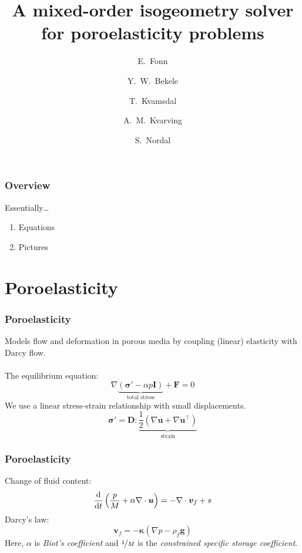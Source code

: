 \documentclass{beamer}
\begin{document}
\title[Mixed-order poroelasticity]{A mixed-order isogeometry solver for poroelasticity problems}
\author[E. Fonn]{
  E.~Fonn \and
  Y.~W.~Bekele \and
  T.~Kvamsdal \and
  A.~M.~Kvarving \and
  S.~Nordal
}
\date[IGA 2015]{}


\begin{frame}
  \titlepage{}
\end{frame}

\begin{frame}
  \frametitle{Overview}

  Essentially\ldots
  \begin{enumerate}
  \item Equations
  \item Pictures
  \end{enumerate}
\end{frame}

\section{Poroelasticity}

\begin{frame}
  \frametitle{Poroelasticity}

  Models flow and deformation in porous media by coupling (linear) elasticity
  with Darcy flow. \\~\\
  
  The equilibrium equation:
  \[
    \nabla \underbrace{\left(\bm{\sigma}' - \alpha p \bm{I} \right)}_{\text{total stress}} + \bm{F} = 0
  \]
  We use a linear stress-strain relationship with small displacements.
  \[
    \bm{\sigma}' = \bm{D} :
    \underbrace{\frac{1}{2}\left( \nabla \bm{u} + \nabla \bm{u}^\intercal \right)}_{\text{strain}}
  \]
\end{frame}

\begin{frame}
  \frametitle{Poroelasticity}

  Change of fluid content:
  \[
    \frac{\text{d}}{\text{d} t}\left( \frac{p}{M} + \alpha \nabla \cdot \bm{u} \right) =
    - \nabla \cdot \bm{v}_f + s
  \]
  Darcy's law:
  \[
    \bm{v}_f = -\bm{\kappa}(\nabla p - \rho_f \bm{g})
  \]
  Here, $\alpha$ is \emph{Biot's coefficient} and $\nicefrac{1}{M}$ is the
  \emph{constrained specific storage coefficient}.
\end{frame}
\end{document}
